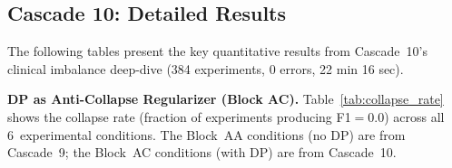 \documentclass[conference,a4paper]{IEEEtran}
\begin{document}
\begin{table}[htbp]
\centering
\caption{DP composition: total $\varepsilon$ after $k$ sequential studies (Block~R, 45 experiments). RDP ratio: na\"ive$/$RDP improvement factor.}
\label{tab:dp_composition}
\end{table}

\subsection{Cascade 10: Detailed Results}

The following tables present the key quantitative results from Cascade~10's clinical imbalance deep-dive (384 experiments, 0 errors, 22 min 16 sec).

\smallskip\noindent\textbf{DP as Anti-Collapse Regularizer (Block AC).} Table~\ref{tab:collapse_rate} shows the collapse rate (fraction of experiments producing F1$=$0.0) across all 6~experimental conditions. The Block~AA conditions (no DP) are from Cascade~9; the Block~AC conditions (with DP) are from Cascade~10.
\end{document}
